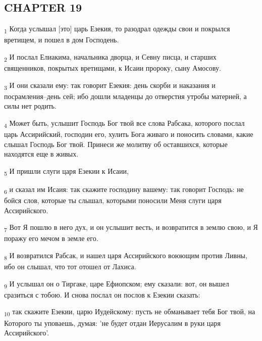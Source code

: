 \subsection{CHAPTER 19}
\begin{tcolorbox}
\textsubscript{1} Когда услышал [это] царь Езекия, то разодрал одежды свои и покрылся вретищем, и пошел в дом Господень.
\end{tcolorbox}
\begin{tcolorbox}
\textsubscript{2} И послал Елиакима, начальника дворца, и Севну писца, и старших священников, покрытых вретищами, к Исаии пророку, сыну Амосову.
\end{tcolorbox}
\begin{tcolorbox}
\textsubscript{3} И они сказали ему: так говорит Езекия: день скорби и наказания и посрамления--день сей; ибо дошли младенцы до отверстия утробы матерней, а силы нет родить.
\end{tcolorbox}
\begin{tcolorbox}
\textsubscript{4} Может быть, услышит Господь Бог твой все слова Рабсака, которого послал царь Ассирийский, господин его, хулить Бога живаго и поносить словами, какие слышал Господь Бог твой. Принеси же молитву об оставшихся, которые находятся еще в живых.
\end{tcolorbox}
\begin{tcolorbox}
\textsubscript{5} И пришли слуги царя Езекии к Исаии,
\end{tcolorbox}
\begin{tcolorbox}
\textsubscript{6} и сказал им Исаия: так скажите господину вашему: так говорит Господь: не бойся слов, которые ты слышал, которыми поносили Меня слуги царя Ассирийского.
\end{tcolorbox}
\begin{tcolorbox}
\textsubscript{7} Вот Я пошлю в него дух, и он услышит весть, и возвратится в землю свою, и Я поражу его мечом в земле его.
\end{tcolorbox}
\begin{tcolorbox}
\textsubscript{8} И возвратился Рабсак, и нашел царя Ассирийского воюющим против Ливны, ибо он слышал, что тот отошел от Лахиса.
\end{tcolorbox}
\begin{tcolorbox}
\textsubscript{9} И услышал он о Тиргаке, царе Ефиопском; ему сказали: вот, он вышел сразиться с тобою. И снова послал он послов к Езекии сказать:
\end{tcolorbox}
\begin{tcolorbox}
\textsubscript{10} так скажите Езекии, царю Иудейскому: пусть не обманывает тебя Бог твой, на Которого ты уповаешь, думая: 'не будет отдан Иерусалим в руки царя Ассирийского'.
\end{tcolorbox}
